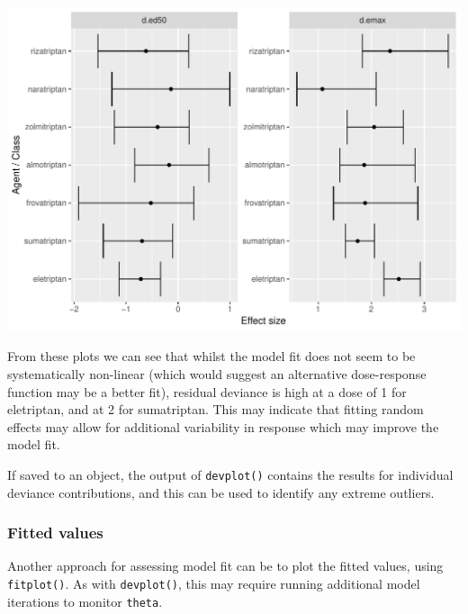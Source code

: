 \documentclass[]{article}
\newenvironment{Shaded}{\begin{snugshade}}{\end{snugshade}}
\newcommand{\CommentTok}[1]{\textcolor[rgb]{0.56,0.35,0.01}{\textit{#1}}}
\newcommand{\KeywordTok}[1]{\textcolor[rgb]{0.13,0.29,0.53}{\textbf{#1}}}
\newcommand{\NormalTok}[1]{#1}
\begin{document}
\includegraphics{mbnmadose_files/figure-latex/unnamed-chunk-36-1.pdf}

From these plots we can see that whilst the model fit does not seem to
be systematically non-linear (which would suggest an alternative
dose-response function may be a better fit), residual deviance is high
at a dose of 1 for eletriptan, and at 2 for sumatriptan. This may
indicate that fitting random effects may allow for additional
variability in response which may improve the model fit.

If saved to an object, the output of \texttt{devplot()} contains the
results for individual deviance contributions, and this can be used to
identify any extreme outliers.

\hypertarget{fitted-values}{%
\subsubsection{Fitted values}\label{fitted-values}}

Another approach for assessing model fit can be to plot the fitted
values, using \texttt{fitplot()}. As with \texttt{devplot()}, this may
require running additional model iterations to monitor \texttt{theta}.

\begin{Shaded}
\end{Shaded}
\end{document}
